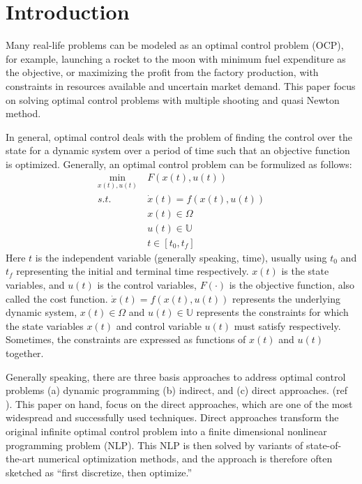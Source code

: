 \documentclass  [
  paper    = a4,
  BCOR     = 10mm,
  twoside,
  fontsize = 12pt,
  fleqn,
  toc      = bibnumbered,
  toc      = listofnumbered,
  numbers  = noendperiod,
  headings = normal,
  listof   = leveldown,
  version  = 3.03
]                                       {scrreprt}
\newcommand{\<}{\langle}
\renewcommand{\>}{\rangle}
\begin{document}
   
   \tableofcontents
    \let\clearpage\relax
   \newpage
   
   
 \chapter{Introduction}  
 \label{Chapter1}
Many real-life problems can be modeled as an optimal control problem (OCP), for example, launching a rocket to the moon with minimum fuel expenditure as the objective, or maximizing the profit from the factory production, with constraints in resources available and uncertain market demand. This paper focus on solving optimal control problems with multiple shooting and quasi Newton method. 

In general, optimal control deals with the problem of finding the control over the state for a dynamic system over a period of time such that an objective function is optimized. Generally, an optimal control problem can be formulized as follows: 
      \begin{equation}
   	\begin{aligned}
   	\underset{x(t), u(t)}{\text{min}}  \ &  F(x(t), u(t)) \\
   		s.t.\ \  &  \dot{x} (t) = f(x(t), u(t))\\ 
   		        & x(t) \in \Omega \\
   		          & u(t) \in \mathbb{U}  \\
   		          & t \in [t_0, t_f]
   	\end{aligned}
   	\label{P1_OPH}
   \end{equation}
 Here $t$ is the independent variable (generally speaking, time), usually using $t_0$ and $t_f$ representing the initial and terminal time respectively. $x(t)$ is the state variables, and $u(t)$ is the control variables, $F(\cdot)$ is the objective function, also called the cost function. $\dot{x} (t) = f(x(t), u(t))$ represents the underlying dynamic system,  $x(t) \in \Omega$ and  $ u(t) \in \mathbb{U}$ represents the constraints for which the state variables $x(t)$ and control variable $u(t)$ must satisfy respectively.  Sometimes, the constraints are expressed as functions of $x(t)$ and $u(t)$ together. 
 

Generally speaking, there are three basis approaches to address optimal control problems (a) dynamic programming (b) indirect, and (c) direct approaches. (ref \cite{MHHP05}). This paper on hand, focus on the direct approaches, which are one of the most widespread and successfully used techniques. Direct approaches transform the original infinite optimal control problem into a finite dimensional nonlinear programming problem (NLP). This NLP is then solved by variants of state-of-the-art numerical optimization methods, and the approach is therefore often sketched as “first discretize, then optimize.” 
\end{document}
